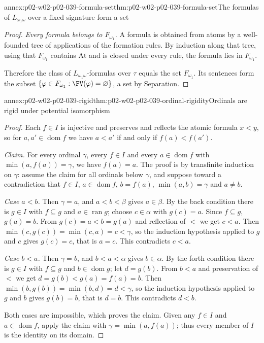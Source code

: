 \begin{annexitem}{annex:p02-w02-p02-039-formula-set}{thm:p02-w02-p02-039-formula-set}{The formulas of \(L_{\omega_1\omega}\) over a fixed signature form a set}
\begin{proof}
\emph{Every formula belongs to \(F_{\omega_1}\).}  A formula is obtained
from atoms by a well-founded tree of applications of the formation rules.
By induction along that tree, using that \(F_{\omega_1}\) contains
\(\mathrm{At}\) and is closed under every rule, the formula lies in
\(F_{\omega_1}\).

Therefore the class of \(L_{\omega_1\omega}\)-formulas over \(\tau\) equals
the set \(F_{\omega_1}\).  Its sentences form the subset
\(\{\varphi\in F_{\omega_1}:\FV(\varphi)=\varnothing\}\), a set by
Separation.
\end{proof}
\end{annexitem}

\begin{annexitem}{annex:p02-w02-p02-039-rigid}{thm:p02-w02-p02-039-ordinal-rigidity}{Ordinals are rigid under potential isomorphism}
\begin{proof}
Each \(f\in I\) is injective and preserves and reflects the atomic formula
\(x<y\), so for \(a,a'\in\operatorname{dom}f\) we have \(a<a'\) if and only
if \(f(a)<f(a')\).

\emph{Claim.}  For every ordinal \(\gamma\), every \(f\in I\) and every
\(a\in\operatorname{dom}f\) with \(\min(a,f(a))=\gamma\), we have
\(f(a)=a\).  The proof is by transfinite induction on \(\gamma\): assume the
claim for all ordinals below \(\gamma\), and suppose toward a contradiction
that \(f\in I\), \(a\in\operatorname{dom}f\), \(b=f(a)\),
\(\min(a,b)=\gamma\) and \(a\neq b\).

\emph{Case \(a<b\).}  Then \(\gamma=a\), and \(a<b<\beta\) gives
\(a\in\beta\).  By the back condition there is \(g\in I\) with
\(f\subseteq g\) and \(a\in\operatorname{ran}g\); choose \(c\in\alpha\)
with \(g(c)=a\).  Since \(f\subseteq g\), \(g(a)=b\).  From
\(g(c)=a<b=g(a)\) and reflection of \(<\) we get \(c<a\).  Then
\(\min(c,g(c))=\min(c,a)=c<\gamma\), so the induction hypothesis applied to
\(g\) and \(c\) gives \(g(c)=c\), that is \(a=c\).  This contradicts
\(c<a\).

\emph{Case \(b<a\).}  Then \(\gamma=b\), and \(b<a<\alpha\) gives
\(b\in\alpha\).  By the forth condition there is \(g\in I\) with
\(f\subseteq g\) and \(b\in\operatorname{dom}g\); let \(d=g(b)\).  From
\(b<a\) and preservation of \(<\) we get \(d=g(b)<g(a)=f(a)=b\).  Then
\(\min(b,g(b))=\min(b,d)=d<\gamma\), so the induction hypothesis applied to
\(g\) and \(b\) gives \(g(b)=b\), that is \(d=b\).  This contradicts
\(d<b\).

Both cases are impossible, which proves the claim.  Given any \(f\in I\)
and \(a\in\operatorname{dom}f\), apply the claim with
\(\gamma=\min(a,f(a))\); thus every member of \(I\) is the identity on its
domain.


\end{proof}
\end{annexitem}

